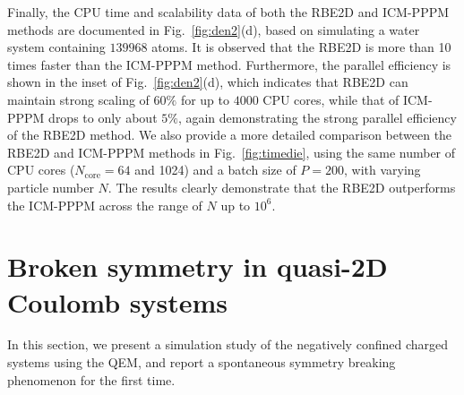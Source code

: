 Finally, the CPU time and scalability data of both the RBE2D and ICM-PPPM methods are documented in Fig.~\ref{fig:den2}(d), based on simulating a water system containing $139968$ atoms. It is observed that the RBE2D is more than 10 times faster than the ICM-PPPM method. 
Furthermore, the   {parallel efficiency} is shown in the inset of Fig.~\ref{fig:den2}(d), which indicates that RBE2D can maintain strong scaling of $60\%$ for up to $4000$ CPU cores, while that of ICM-PPPM drops to only about $5\%$, again demonstrating the strong parallel efficiency of the RBE2D method.  {We also provide a more detailed comparison between the RBE2D and ICM-PPPM methods in Fig.~\ref{fig:timedie}, using the same number of CPU cores (\( N_{\text{core}} = 64 \) and 1024) and a batch size of \( P = 200 \), with varying particle number $N$. 
The results clearly demonstrate that the RBE2D outperforms the ICM-PPPM across the range of \( N \) up to \( 10^6 \).}

\section{Broken symmetry in quasi-2D Coulomb systems}\label{sec::ssb}

In this section, we present a simulation study of the negatively confined charged systems using the QEM, and report a spontaneous symmetry breaking phenomenon for the first time.


